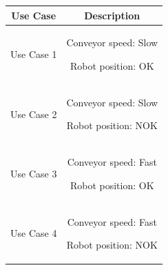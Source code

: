 \documentclass[5p,times,procedia]{elsarticle}
\begin{document}
\begin{table}
       \centering
       \begin{tabular}{ c c } \toprule
              Use Case        & Description \\ \midrule
              Use Case 1  & \begin{minipage}[t]{0.25\textwidth}
                            \begin{description}
                                   \item Conveyor speed: Slow
                                   \item Robot position: OK
                            \end{description}
                            \end{minipage}  \\ \hline
              Use Case 2  & \begin{minipage}[t]{0.25\textwidth}
                            \begin{description}
                                   \item Conveyor speed: Slow
                                   \item Robot position: NOK
                            \end{description}
                            \end{minipage}  \\ \hline
              Use Case 3  & \begin{minipage}[t]{0.25\textwidth}
                            \begin{description}
                                   \item Conveyor speed: Fast
                                   \item Robot position: OK
                            \end{description}
                            \end{minipage}  \\ \hline
              Use Case 4  & \begin{minipage}[t]{0.25\textwidth}
                            \begin{description}
                                   \item Conveyor speed: Fast
                                   \item Robot position: NOK
                            \end{description}
                            \end{minipage}  \\ \hline

\end{tabular}
\end{table}
\end{document}
